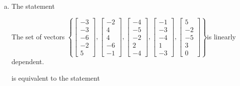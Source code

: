 \begin{exerciseAnswer}
\begin{enumerate}[(a)]
\item The statement 
\begin{center}\begin{minipage}{0.8\textwidth}
 The set of vectors \( \left\{ \left[\begin{array}{c}
-3 \\
-3 \\
-6 \\
-2 \\
5
\end{array}\right] , \left[\begin{array}{c}
-2 \\
4 \\
4 \\
-6 \\
-1
\end{array}\right] , \left[\begin{array}{c}
-4 \\
-5 \\
-2 \\
2 \\
-4
\end{array}\right] , \left[\begin{array}{c}
-1 \\
-3 \\
-4 \\
1 \\
-3
\end{array}\right] , \left[\begin{array}{c}
5 \\
-2 \\
-5 \\
3 \\
0
\end{array}\right] \right\} \)is linearly dependent.
\end{minipage}\end{center}
     is equivalent to the statement 
\begin{center}\begin{minipage}{0.8\textwidth}
 The vector equation \( x_{1} \left[\begin{array}{c}
-3 \\
-3 \\
-6 \\
-2 \\
5
\end{array}\right] + x_{2} \left[\begin{array}{c}
-2 \\
4 \\

\end{array}
\end{minipage}
\end{center}
\end{enumerate}
\end{exerciseAnswer}
